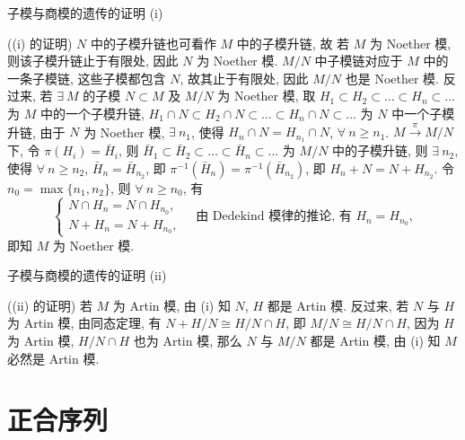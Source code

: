 \begin{frame}{子模与商模的遗传的证明 (i)}

\startproof[bg=yellow, fg=red]((i) 的证明)
$N$ 中的子模升链也可看作 $M$ 中的子模升链, 故
若 $M$ 为 Noether 模, 则该子模升链止于有限处,
因此 $N$ 为 Noether 模.
$M/N$ 中子模链对应于 $M$ 中的一条子模链, 这些子模都包含 $N$,
故其止于有限处, 因此 $M/N$ 也是 Noether 模.
\pause
反过来, 若 $\exists\ M$ 的子模 $N \subset M$ 及 $M/N$ 为 Noether 模,
取 $H_1 \subset H_2 \subset \dots \subset H_n \subset \dots$ 为 $M$
中的一个子模升链,
$H_1 \cap N \subset H_2 \cap N \subset \dots \subset H_n \cap N \subset \dots$
为 $N$ 中一个子模升链,
由于 $N$ 为 Noether 模, $\exists\ n_1$, 使得
$H_n \cap N = H_{n_1} \cap N$, $\forall\ n \geqslant n_1$.
$M \xrightarrow{\ \pi\ } M/N$ 下, 令 $\pi(H_i) = \bar{H}_i$, 则
$\bar{H}_1 \subset \bar{H}_2 \subset \dots \subset \bar{H}_n \subset \dots$
为 $M/N$ 中的子模升链, 则 $\exists\ n_2$, 使得 $\forall\ n \geqslant n_2$,
$\bar{H}_n = \bar{H}_{n_2}$,
即 $\pi^{-1}(\bar{H}_n) = \pi^{-1}(\bar{H}_{n_2})$,
即 $H_n + N = N + H_{n_2}$.
\pause
令 $n_0 = \max\{n_1, n_2\}$, 则 $\forall\ n \geqslant n_0$, 有
\[
\begin{cases}
N \cap H_n = N \cap H_{n_0}, \\
N + H_n = N + H_{n_0},
\end{cases}
\quad \text{由 Dedekind 模律的推论, 有 } H_n = H_{n_0},
\]
即知 $M$ 为 Noether 模.

\end{frame}


\begin{frame}{子模与商模的遗传的证明 (ii)}

\startproof[bg=yellow, fg=red]((ii) 的证明)
若 $M$ 为 Artin 模, 由 (i) 知 $N$, $H$ 都是 Artin 模.
反过来, 若 $N$ 与 $H$ 为 Artin 模, 由同态定理,
有 $N + H/N \cong H/N \cap H$, 即 $M/N \cong H/N \cap H$,
因为 $H$ 为 Artin 模, $H/N \cap H$ 也为 Artin 模,
那么 $N$ 与 $M/N$ 都是 Artin 模, 由 (i) 知 $M$ 必然是 Artin 模.

\end{frame}


\section[正合序列]{正合序列}


